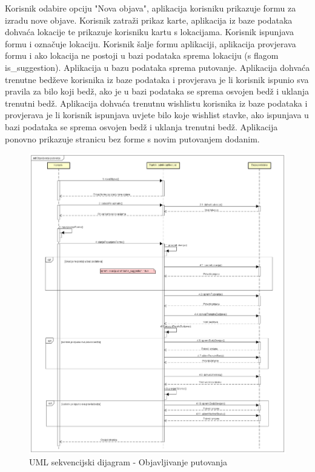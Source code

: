                 
                Korisnik odabire opciju "Nova objava", aplikacija korisniku prikazuje formu za izradu nove objave. Korisnik zatraži prikaz karte, aplikacija iz baze podataka dohvaća lokacije te prikazuje korisniku kartu s lokacijama. Korisnik ispunjava formu i označuje lokaciju. Korisnik šalje formu aplikaciji, aplikacija provjerava formu i ako lokacija ne postoji u bazi podataka sprema lokaciju (s flagom is\_suggestion). Aplikacija u bazu podataka sprema putovanje. Aplikacija dohvaća trenutne bedževe korisnika iz baze podataka i provjerava je li korisnik ispunio sva pravila za bilo koji bedž, ako je u bazi podataka se sprema osvojen bedž i uklanja trenutni bedž. Aplikacija dohvaća trenutnu wishlistu korisnika iz baze podataka i provjerava je li korisnik ispunjava uvjete bilo koje wishlist stavke, ako ispunjava u bazi podataka se sprema osvojen bedž i uklanja trenutni bedž. Aplikacija ponovno prikazuje stranicu bez forme s novim putovanjem dodanim.
                \begin{figure}[H]
                	\includegraphics[scale=0.4]{slike/SD-objavljivanjeputovanja.png} %
                	\centering
                	\caption{UML sekvencijski dijagram - Objavljivanje putovanja}
                			
                \end{figure}
                

